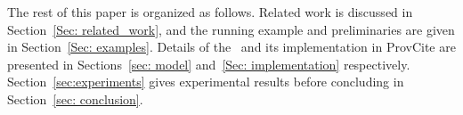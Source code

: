 The rest of this paper is organized as follows.
Related work is discussed in Section~\ref{Sec: related_work}, and the running example and preliminaries are given in Section~\ref{Sec: examples}.  Details of the \pba\ and its implementation in ProvCite are presented in Sections~\ref{sec: model} and~\ref{Sec: implementation} respectively. Section~\ref{sec:experiments} gives experimental results before concluding in Section~\ref{sec: conclusion}.







